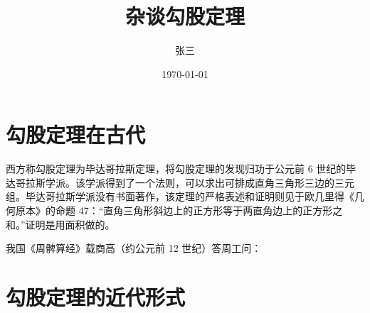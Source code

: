 \documentclass[UTF8]{ctexart}
\title{杂谈勾股定理}
\author{张三}
\date{\today}
\begin{document}
\maketitle
\tableofcontents
\section{勾股定理在古代}
西方称勾股定理为毕达哥拉斯定理，将勾股定理的发现归功于公元前 6 世纪的毕达哥拉斯学派。该学派得到了一个法则，可以求出可排成直角三角形三边的三元组。毕达哥拉斯学派没有书面著作，该定理的严格表述和证明则见于欧几里得《几何原本》的命题 47：“直角三角形斜边上的正方形等于两直角边上的正方形之和。”证明是用面积做的。


我国《周髀算经》载商高（约公元前 12 世纪）答周工问：
\section{勾股定理的近代形式}

\end{document}
